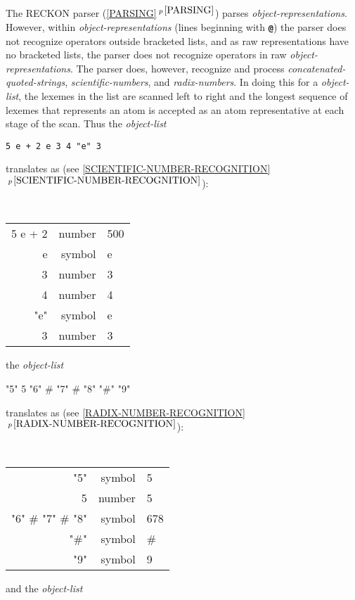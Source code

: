 \documentclass[12pt]{article}
\newcommand{\TT}[1]{{\tt \bfseries #1}}
\newcommand{\secref}[1]{\ref{#1}$\,^{p\,\pageref{#1}}$}
\begin{document}
The RECKON parser (\secref{PARSING}) parses {\em object-representations}.
However, within {\em object-representa\-tions} (lines beginning with \TT{@})
the parser does not recognize operators outside bracketed lists, and as
raw representations have no bracketed lists, the parser does not recognize
operators in raw {\em object-representations}.%
\label{RAW-PARSING}
The parser does, however,
recognize and process {\em concatenated-quoted-strings},
{\em scientific-numbers}, and {\em radix-numbers}.
In doing this for a {\em object-list}, the lexemes in the list are scanned
left to right and the longest sequence of lexemes that represents an
atom is accepted as an atom representative at each stage of the scan.
Thus the {\em object-list}
\begin{center}
\tt 5 e + 2 e 3 4 "e" 3
\end{center}
translates as (see \secref{SCIENTIFIC-NUMBER-RECOGNITION}):
\begin{center}
\tt
\begin{tabular}{r@{~~$\Longrightarrow$~~}rl}
5 e + 2 & \rm number & 500 \\
e	& \rm symbol & e \\
3	& \rm number & 3 \\
4	& \rm number & 4 \\
"e"	& \rm symbol & e \\
3	& \rm number & 3 \\
\end{tabular}
\end{center}

the {\em object-list}

\begin{center}
"5" 5 "6" \# "7" \# "8" "\#" "9"
\end{center}
translates as (see \secref{RADIX-NUMBER-RECOGNITION}):
\begin{center}
\tt
\begin{tabular}{r@{~~$\Longrightarrow$~~}rl}

"5"			& \rm symbol & 5 \\
5			& \rm number & 5 \\
"6" \# "7" \# "8"	& \rm symbol & 678 \\
"\#"			& \rm symbol & \# \\
"9"			& \rm symbol & 9 \\
\end{tabular}
\end{center}

and the {\em object-list}
\end{document}
